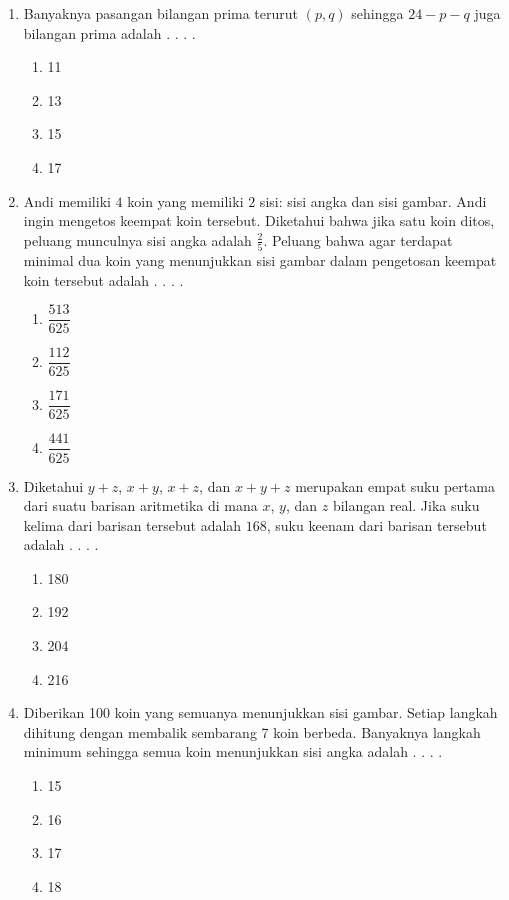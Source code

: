 \documentclass{article}
\begin{document}
\begin{enumerate}
    \item Banyaknya pasangan bilangan prima terurut $(p,q)$ sehingga $24-p-q$ juga bilangan prima adalah . . . .
    \begin{enumerate}[label={(\Alph*)}]
        \item 11 \item 13 \item 15 \item 17
    \end{enumerate}

    \item Andi memiliki $4$ koin yang memiliki $2$ sisi: sisi angka dan sisi gambar. Andi ingin mengetos keempat koin tersebut. Diketahui bahwa jika satu koin ditos, peluang munculnya sisi angka adalah $\frac{2}{5}$. Peluang bahwa agar terdapat minimal dua koin yang menunjukkan sisi gambar dalam pengetosan keempat koin tersebut adalah . . . .
    \begin{enumerate}[label={(\Alph*)}]
        \item $\dfrac{513}{625}$ \item $\dfrac{112}{625}$ \item $\dfrac{171}{625}$ \item $\dfrac{441}{625}$
    \end{enumerate}

    \item Diketahui $y+z$, $x+y$, $x+z$, dan $x+y+z$ merupakan empat suku pertama dari suatu barisan aritmetika di mana $x$, $y$, dan $z$ bilangan real. Jika suku kelima dari barisan tersebut adalah $168$, suku keenam dari barisan tersebut adalah . . . .
    \begin{enumerate}[label={(\Alph*)}]
        \item 180 \item 192 \item 204 \item 216
    \end{enumerate}

    \item Diberikan 100 koin yang semuanya menunjukkan sisi gambar. Setiap langkah dihitung dengan membalik sembarang 7 koin berbeda. Banyaknya langkah minimum sehingga semua koin menunjukkan sisi angka adalah . . . .
    \begin{enumerate}[label={(\Alph*)}]
        \item 15 \item 16 \item 17 \item 18
    \end{enumerate}


\end{enumerate}
\end{document}
